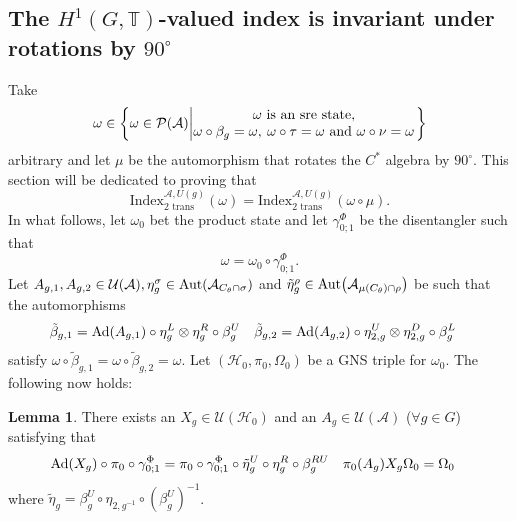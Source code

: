 \documentclass[12pt,a4paper,twoside]{article}
\let\originalleft\left
\let\originalright\right
\renewcommand{\left}{\mathopen{}\mathclose\bgroup\originalleft}
\renewcommand{\right}{\aftergroup\egroup\originalright}
\newcommand{\UU}{\mathcal U}
\newcommand{\PP}{\mathcal P}
\newcommand{\HH}{\mathcal H}
\newcommand{\TT}{\mathbb T}
\renewcommand{\AA}{\mathcal A}
\newcommand{\Ad}[1]{\textrm{Ad}\left(#1\right)}
\newcommand{\Aut}[1]{\textrm{Aut}\left(#1\right)}
\theoremstyle{definition}
\newtheorem{lemma}[theorem]{Lemma}
\numberwithin{equation}{section}
\begin{document}
\subsection{The $H^1(G,\TT)$-valued index is invariant under rotations by $90^\circ$}
Take
\begin{equation}
	\omega\in\left\{\omega\in\PP(\AA)\left| \begin{matrix}\omega\text{ is an sre state,}\\\omega\circ\beta_g=\omega,\:\omega\circ\tau=\omega\text{ and }\omega\circ\nu=\omega\end{matrix} \right.\right\}
\end{equation}
arbitrary and let $\mu$ be the automorphism that rotates the $C^*$ algebra by $90^\circ$. This section will be dedicated to proving that
\begin{equation}
	\textrm{Index}_{\text{2 trans}}^{\AA,U(g)}(\omega)=\textrm{Index}_{\text{2 trans}}^{\AA,U(g)}(\omega\circ\mu).
\end{equation}
In what follows, let $\omega_0$ bet the product state and let $\gamma^\Phi_{0;1}$ be the disentangler such that
\begin{equation}
	\omega=\omega_0\circ\gamma^\Phi_{0;1}.
\end{equation}
Let $A_{g,1},A_{g,2}\in\UU(\AA),\eta^\sigma_g\in\Aut{\AA_{C_\theta\cap\sigma}}$ and $\tilde{\eta}^\rho_g\in\Aut{\AA_{\mu(C_\theta)\cap\rho}}$ be such that the automorphisms
\begin{align}
	\tilde{\beta}_{g,1}&=\Ad{A_{g,1}}\circ\eta_g^L\otimes\eta_g^R\circ\beta_g^U&\tilde{\beta}_{g,2}&=\Ad{A_{g,2}}\circ\eta_{2,g}^U\otimes\eta_{2,g}^D\circ\beta_g^L
\end{align}
satisfy $\omega\circ\tilde{\beta}_{g,1}=\omega\circ\tilde{\beta}_{g,2}=\omega$. Let $(\HH_0,\pi_0,\Omega_0)$ be a GNS triple for $\omega_0$. The following now holds:
\begin{lemma}
	There exists an $X_g\in\UU(\HH_0)$ and an $A_g\in\UU(\AA)$ ($\forall g\in G$) satisfying that
	\begin{align}
		\Ad{X_g}\circ\pi_0\circ\gamma^\Phi_{0;1}&=\pi_0\circ\gamma^\Phi_{0;1}\circ\tilde{\eta}^U_g\circ\eta^R_g\circ\beta_g^{RU}&\pi_0(A_g)X_g\Omega_0&=\Omega_0
	\end{align}
	where $\tilde{\eta}_g=\beta_g^U\circ\eta_{2,g^{-1}}\circ(\beta_g^U)^{-1}$.
\end{lemma}
\end{document}
